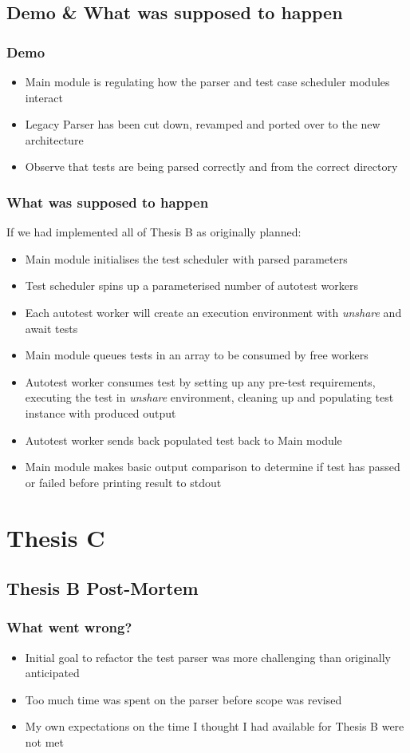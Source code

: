 \documentclass[xcolor]{beamer}
\begin{document}
\subsection{Demo \& What was supposed to happen}
\begin{frame}
	\frametitle{Demo}
	\begin{itemize}
		\item Main module is regulating how the parser and test case scheduler modules interact
		\item Legacy Parser has been cut down, revamped and ported over to the new architecture
		\item Observe that tests are being parsed correctly and from the correct directory
	\end{itemize}
\end{frame}

\begin{frame}
	\frametitle{What was supposed to happen}
	If we had implemented all of Thesis B as originally planned:
	\begin{itemize}
		\item Main module initialises the test scheduler with parsed parameters
		\pause
		\item Test scheduler spins up a parameterised number of autotest workers
		\pause
		\item Each autotest worker will create an execution environment with \textit{unshare} and await tests
		\pause
		\item Main module queues tests in an array to be consumed by free workers
		\pause
		\item Autotest worker consumes test by setting up any pre-test requirements, executing the test in \textit{unshare} environment, cleaning up and populating test instance with produced output
		\pause
		\item Autotest worker sends back populated test back to Main module
		\pause
		\item Main module makes basic output comparison to determine if test has passed or failed before printing result to stdout
	\end{itemize}
\end{frame}

\section{Thesis C}
\subsection{Thesis B Post-Mortem}
\begin{frame}
	\frametitle{What went wrong?}
	\begin{itemize}
		\item Initial goal to refactor the test parser was more challenging than originally anticipated
		\pause
		\item Too much time was spent on the parser before scope was revised
		\pause
		\item My own expectations on the time I thought I had available for Thesis B were not met
	\end{itemize}
\end{frame}
\end{document}
